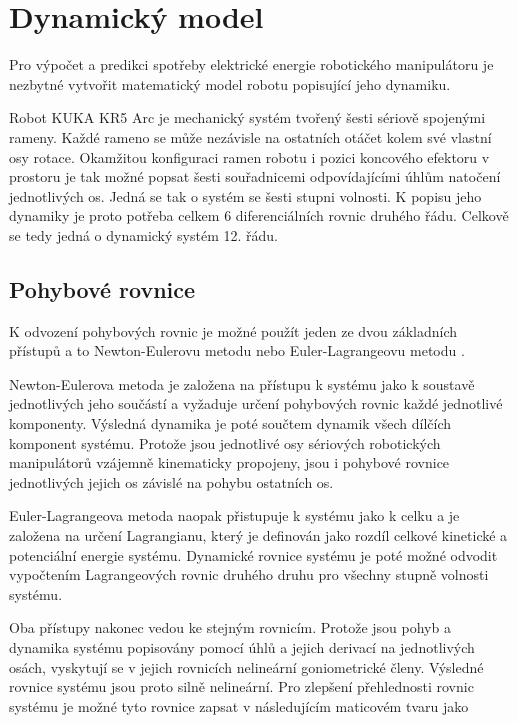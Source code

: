 

\chapter{Dynamický model}

Pro výpočet a predikci spotřeby elektrické energie robotického manipulátoru je nezbytné vytvořit matematický model robotu popisující jeho dynamiku.

Robot KUKA KR5 Arc je mechanický systém tvořený šesti sériově spojenými rameny. Každé rameno se může nezávisle na ostatních otáčet kolem své vlastní osy rotace. Okamžitou konfiguraci ramen robotu i pozici koncového efektoru v prostoru je tak možné popsat šesti souřadnicemi odpovídajícími úhlům natočení jednotlivých os. Jedná se tak o systém se šesti stupni volnosti. K popisu jeho dynamiky je proto potřeba celkem 6 diferenciálních rovnic druhého řádu. Celkově se tedy jedná o dynamický systém 12. řádu. 

\section{Pohybové rovnice}
\label{pohybove_rovnice_sec}
K odvození pohybových rovnic je možné použít jeden ze dvou základních přístupů a to Newton-Eulerovu metodu nebo Euler-Lagrangeovu metodu \cite{rob_mod_control}. 

Newton-Eulerova metoda je založena na přístupu k systému jako k soustavě jednotlivých jeho součástí a vyžaduje určení pohybových rovnic každé jednotlivé komponenty. Výsledná dynamika je poté součtem dynamik všech dílčích komponent systému. Protože jsou jednotlivé osy sériových robotických manipulátorů vzájemně kinematicky propojeny, jsou i pohybové rovnice jednotlivých jejich os závislé na pohybu ostatních os. 

Euler-Lagrangeova metoda naopak přistupuje k systému jako k celku a je založena na určení Lagrangianu, který je definován jako rozdíl celkové kinetické a potenciální energie systému. Dynamické rovnice systému je poté možné odvodit vypočtením Lagrangeových rovnic druhého druhu pro všechny stupně volnosti systému.

Oba přístupy nakonec vedou ke stejným rovnicím. Protože jsou pohyb a dynamika systému popisovány pomocí úhlů a jejich derivací na jednotlivých osách, vyskytují se v jejich rovnicích nelineární goniometrické členy. Výsledné rovnice systému jsou proto silně nelineární. Pro zlepšení přehlednosti rovnic systému je možné tyto rovnice zapsat v následujícím maticovém tvaru jako 

